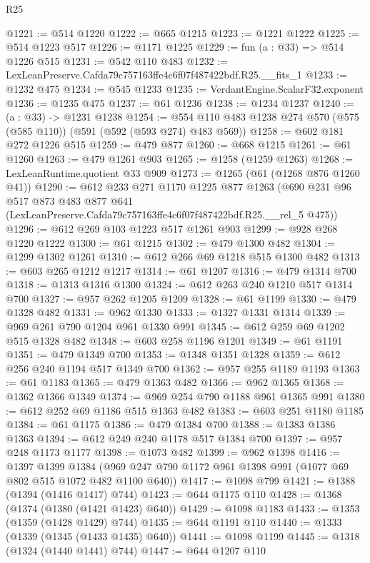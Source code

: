 \begin{lexlean}{R25}
\begin{coremodule}
@1221 := @514 @1220
@1222 := @665 @1215
@1223 := @1221 @1222
@1225 := @514 @1223 @517
@1226 := @1171 @1225
@1229 := fun (a : @33) => @514 @1226 @515
@1231 := @542 @110 @483
@1232 := LexLeanPreserve.Cafda79c757163ffe4c6f07f487422bdf.R25.__fits_1
@1233 := @1232 @475
@1234 := @545 @1233
@1235 := VerdantEngine.ScalarF32.exponent
@1236 := @1235 @475
@1237 := @61 @1236
@1238 := @1234 @1237
@1240 := (a : @33) -> @1231 @1238
@1254 := @554 @110 @483 @1238 @274 @570 (@575 (@585 @110)) (@591 (@592 (@593 @274) @483 @569))
@1258 := @602 @181 @272 @1226 @515
@1259 := @479 @877
@1260 := @668 @1215
@1261 := @61 @1260
@1263 := @479 @1261 @903
@1265 := @1258 (@1259 @1263)
@1268 := LexLeanRuntime.quotient @33 @909
@1273 := @1265 (@61 (@1268 @876 @1260 @41))
@1290 := @612
    @233
    @271
    @1170
    @1225
    @877
    @1263
    (@690
      @231
      @96
      @517
      @873
      @483
      @877
      @641
      (LexLeanPreserve.Cafda79c757163ffe4c6f07f487422bdf.R25.__rel_5 @475))
@1296 := @612 @269 @103 @1223 @517 @1261 @903
@1299 := @928 @268 @1220 @1222
@1300 := @61 @1215
@1302 := @479 @1300 @482
@1304 := @1299 @1302 @1261
@1310 := @612 @266 @69 @1218 @515 @1300 @482
@1313 := @603 @265 @1212 @1217
@1314 := @61 @1207
@1316 := @479 @1314 @700
@1318 := @1313 @1316 @1300
@1324 := @612 @263 @240 @1210 @517 @1314 @700
@1327 := @957 @262 @1205 @1209
@1328 := @61 @1199
@1330 := @479 @1328 @482
@1331 := @962 @1330
@1333 := @1327 @1331 @1314
@1339 := @969 @261 @790 @1204 @961 @1330 @991
@1345 := @612 @259 @69 @1202 @515 @1328 @482
@1348 := @603 @258 @1196 @1201
@1349 := @61 @1191
@1351 := @479 @1349 @700
@1353 := @1348 @1351 @1328
@1359 := @612 @256 @240 @1194 @517 @1349 @700
@1362 := @957 @255 @1189 @1193
@1363 := @61 @1183
@1365 := @479 @1363 @482
@1366 := @962 @1365
@1368 := @1362 @1366 @1349
@1374 := @969 @254 @790 @1188 @961 @1365 @991
@1380 := @612 @252 @69 @1186 @515 @1363 @482
@1383 := @603 @251 @1180 @1185
@1384 := @61 @1175
@1386 := @479 @1384 @700
@1388 := @1383 @1386 @1363
@1394 := @612 @249 @240 @1178 @517 @1384 @700
@1397 := @957 @248 @1173 @1177
@1398 := @1073 @482
@1399 := @962 @1398
@1416 := @1397
    @1399
    @1384
    (@969 @247 @790 @1172 @961 @1398 @991 (@1077 @69 @802 @515 @1072 @482 @1100 @640))
@1417 := @1098 @799
@1421 := @1388 (@1394 (@1416 @1417) @744)
@1423 := @644 @1175 @110
@1428 := @1368 (@1374 (@1380 (@1421 @1423) @640))
@1429 := @1098 @1183
@1433 := @1353 (@1359 (@1428 @1429) @744)
@1435 := @644 @1191 @110
@1440 := @1333 (@1339 (@1345 (@1433 @1435) @640))
@1441 := @1098 @1199
@1445 := @1318 (@1324 (@1440 @1441) @744)
@1447 := @644 @1207 @110

\end{coremodule}
\end{lexlean}
